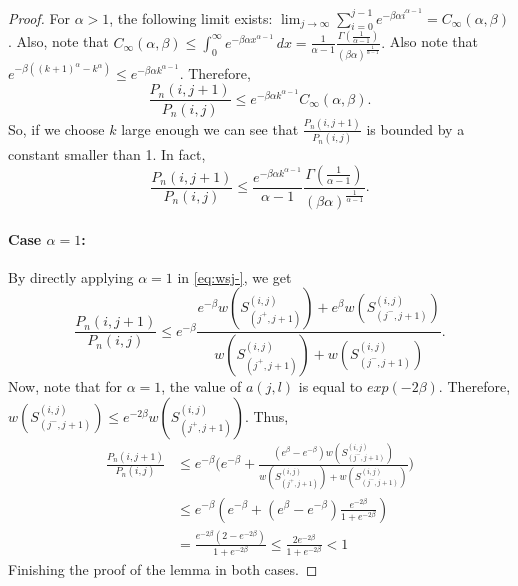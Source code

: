 \documentclass{article}
\begin{document}
\begin{proof}
For $\alpha>1$, the following limit  exists: $\lim_{j\to\infty}\sum_{i=0}^{j-1}e^{-\beta\alpha i^{\alpha-1}}=C_\infty(\alpha,\beta)$. Also, note that $C_\infty(\alpha,\beta)\leq \int_{0}^{\infty} e^{-\beta \alpha x^{\alpha - 1}} \, dx = \frac{1}{\alpha - 1} \frac{\Gamma\left(\frac{1}{\alpha - 1}\right)}{(\beta \alpha)^{\frac{1}{\alpha - 1}}}.
$ Also note that  $e^{-\beta((k+1)^\alpha-k^\alpha)}\leq e^{-\beta\alpha k^{\alpha-1}}$.
Therefore, 
$$\frac{P_n(i,j+1)}{P_n(i,j)}\leq e^{-\beta\alpha k^{\alpha-1}}C_\infty(\alpha,\beta).$$
 So, if we choose $k$ large enough we can see that $\frac{P_n(i,j+1)}{P_n(i,j)}$ is bounded by a constant smaller than 1. In fact,
$$\frac{P_n(i,j+1)}{P_n(i,j)}\leq 
\frac{e^{-\beta\alpha k^{\alpha-1}}}{\alpha - 1} \frac{\Gamma\left(\frac{1}{\alpha - 1}\right)}{(\beta \alpha)^{\frac{1}{\alpha - 1}}}.$$






\paragraph{Case $\alpha=1$:}    
By directly applying $\alpha=1$ in \eqref{eq:wsj-}, we get 
\begin{equation*}
        \frac{P_n(i,j+1)}{P_n(i,j)} \leq 
       e^{-\beta}\frac{e^{-\beta}w(S^{(i,j)}_{(j^+,j+1)}) + e^{\beta}w(S^{(i,j)}_{(j^-,j+1)}) }
        { w(S^{(i,j)}_{(j^+,j+1)}) + w(S^{(i,j)}_{(j^-,j+1)})}.
    \end{equation*}
    Now, note that for $\alpha=1$, the value of $a(j,l)$ is equal to $exp(-2\beta)$. Therefore, $w(S^{(i,j)}_{(j^-,j+1)})\leq e^{-2\beta}w(S^{(i,j)}_{(j^+,j+1)})$. Thus,
     \begin{align*}
        \frac{P_n(i,j+1)}{P_n(i,j)} &\leq 
       e^{-\beta}\Big(e^{-\beta}+\frac{(e^{\beta}-e^{-\beta})w(S^{(i,j)}_{(j^-,j+1)}) }
        { w(S^{(i,j)}_{(j^+,j+1)}) + w(S^{(i,j)}_{(j^-,j+1)})}\Big)\\
        & \leq 
       e^{-\beta}(e^{-\beta}+(e^{\beta}-e^{-\beta})\frac{e^{-2\beta}}
        { 1 + e^{-2\beta}})\\
        &=\frac{e^{-2\beta}(2-e^{-2\beta})}{1+e^{-2\beta}}\leq \frac{2e^{-2\beta}}{1+e^{-2\beta}}<1
    \end{align*}
Finishing the proof of the lemma in both cases.
\end{proof}
\end{document}
